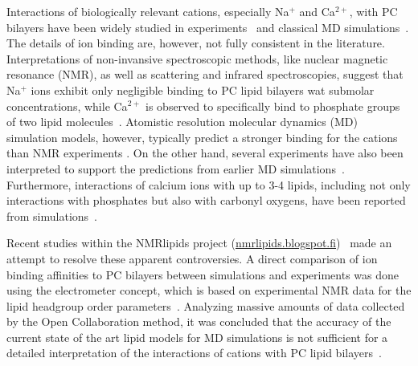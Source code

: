\documentclass[aip,jcp,twocolumn]{revtex4}
\begin{document}
Interactions of biologically relevant cations, especially Na$^+$ and
Ca$^{2+}$, with PC bilayers have been widely studied in
experiments~\cite{akutsu81,altenbach84,seelig90,cevc90,tocanne90,binder02,pabst07,uhrikova08}
and classical MD simulations~\cite{bockmann03,bockmann04,Berkowitz12,melcrova16,javanainen17}.
The details of ion binding are, however, not fully consistent in the literature.
Interpretations of non-invansive spectroscopic methods, like nuclear magnetic resonance (NMR), as well as scattering
and infrared spectroscopies, suggest that Na$^+$ ions exhibit only
negligible binding to PC lipid bilayers wat submolar concentrations, while Ca$^{2+}$ is observed to specifically
bind to phosphate groups of two lipid molecules~\cite{hauser76,hauser78,herbette84,akutsu81,altenbach84,binder02,pabst07,uhrikova08}.
Atomistic resolution molecular dynamics (MD) simulation models, however, typically predict a
stronger binding for the cations than NMR experiments \cite{catte16}.
On the other hand, several experiments have also been interpreted to support the predictions from
earlier MD simulations~\cite{bockmann03,vacha09a}. 
Furthermore, interactions of calcium ions with up to 3-4 lipids,
including not only interactions with phosphates but also with carbonyl
oxygens, have been reported from simulations~\cite{bockmann03,bockmann04,melcrova16,javanainen17}.


Recent studies within the NMRlipids project (\url{nmrlipids.blogspot.fi})~\cite{catte16}
made an attempt to resolve these apparent controversies. A direct comparison of
ion binding affinities to PC bilayers between simulations and
experiments was done using the electrometer concept, which is based on experimental NMR data
for the lipid headgroup order parameters~\cite{seelig87}.
Analyzing massive amounts of data collected by the Open Collaboration method, it was concluded
that the accuracy of the current state of the art lipid models for MD
simulations is not sufficient for a detailed interpretation of the
interactions of cations with PC lipid bilayers~\cite{catte16}.
\end{document}
